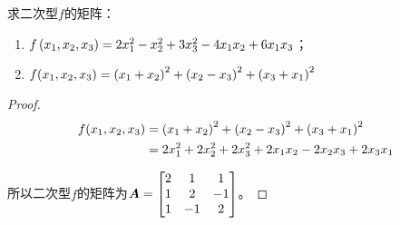 \begin{problem}
求二次型\(f\)的矩阵：
\begin{enumerate}
    \item \(f\left( x_1,x_2,x_3 \right)=2x_1^2-x_2^2+3x_3^2-4x_1x_2+6x_1x_3\)；
    \item \(f(x_1,x_2,x_3)=\left( x_1+x_2 \right)^2+\left( x_2-x_3 \right)^2+\left( x_3+x_1 \right)^2\)
\end{enumerate}
\end{problem}
\begin{proof}
    \begin{align*}
        f(x_1,x_2,x_3) & =\left( x_1+x_2 \right)^2+\left( x_2-x_3 \right)^2+\left( x_3+x_1 \right)^2 \\
                       & =2x_1^2+2x_2^2+2x_3^2+2x_1x_2-2x_2x_3+2x_3x_1
    \end{align*}

    所以二次型\(f\)的矩阵为\(\boldsymbol{A}=\begin{bmatrix}2&1&1\\1&2&-1\\1&-1&2\end{bmatrix}\)。
\end{proof}

